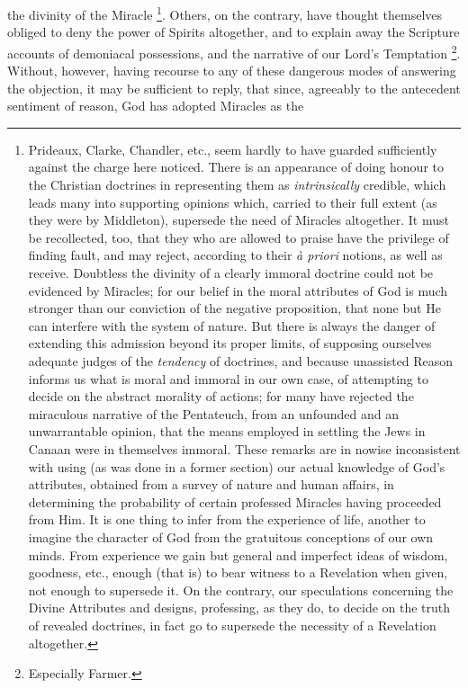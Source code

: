the divinity of the Miracle \footnote{Prideaux, Clarke, Chandler, etc., seem hardly to have guarded
sufficiently against the charge here noticed. There is an appearance
of doing honour to the Christian doctrines in representing them as \emph{intrinsically}
credible, which leads many into supporting opinions which, carried to
their full extent (as they were by Middleton), supersede the need of
Miracles altogether. It must be recollected, too, that they who are
allowed to praise have the privilege of finding fault, and may reject,
according to their \emph{à priori} notions, as well as receive.
Doubtless the divinity of a clearly immoral doctrine could not be
evidenced by Miracles; for our belief in the moral attributes of God
is much stronger than our conviction of the negative proposition, that
none but He can interfere with the system of nature. But there is
always the danger of extending this admission beyond its proper
limits, of supposing ourselves adequate judges of the \emph{tendency}
of doctrines, and because unassisted Reason informs us what is moral
and immoral in our own case, of attempting to decide on the abstract
morality of actions; for many have rejected the miraculous narrative
of the Pentateuch, from an unfounded and an unwarrantable opinion,
that the means employed in settling the Jews in Canaan were in
themselves immoral. These remarks are in nowise inconsistent with
using (as was done in a former section) our actual knowledge of God's
attributes, obtained from a survey of nature and human affairs, in
determining the probability of certain professed Miracles having
proceeded from Him. It is one thing to infer from the experience of
life, another to imagine the character of God from the gratuitous
conceptions of our own minds. From experience we gain but general and
imperfect ideas of wisdom, goodness, etc., enough (that is) to bear
witness to a Revelation when given, not enough to supersede it. On the
contrary, our speculations concerning the Divine Attributes and
designs, professing, as they do, to decide on the truth of revealed
doctrines, in fact go to supersede the necessity of a Revelation
altogether.}.
Others, on the contrary, have thought themselves obliged to deny
the power of Spirits altogether, and to explain away the Scripture
accounts of demoniacal possessions, and the narrative of our Lord's
Temptation \footnote{Especially Farmer.}. Without,
however, having recourse to any of these dangerous modes of answering
the objection, it may be sufficient to reply, that since, agreeably to
the antecedent sentiment of reason, God has adopted Miracles as the
